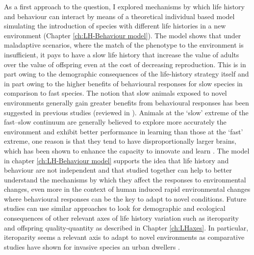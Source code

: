 As a first approach to the question, I explored mechanisms by which life history
and behaviour can interact by means of a theoretical individual based model
simulating the introduction of species with different life histories in a new
environment (Chapter \ref{ch:LH-Behaviour model}). The model shows that under
maladaptive scenarios, where the match of the phenotype to the environment is
insufficient, it pays to have a slow life history that increase the value of
adults over the value of offspring even at the cost of decreasing reproduction.
This is in part owing to the demographic consequences of the life-history
strategy itself and in part owing to the higher benefits of behavioural
responses for slow species in comparison to fast species.
The notion that slow animals exposed to novel environments generally gain
greater benefits from behavioural responses has been suggested in previous
studies (reviewed in \citet{Sol2016}). Animals at the ‘slow’ extreme of the
fast–slow continuum are generally believed to explore more accurately the
environment and exhibit better performance in learning than those at the ‘fast’
extreme, one reason is that they tend to have disproportionally larger brains,
which has been shown to enhance the capacity to innovate and learn
\citep{Lefebvre1997,Reader2002,Overington2009,Reader2011}. The model in chapter
\ref{ch:LH-Behaviour model} supports the idea that life history and behaviour
are not independent and that studied together can help to better understand the
mechanisms by which they affect the responses to environmental changes, even
more in the context of human induced rapid environmental changes where
behavioural responses can be the key to adapt to novel conditions. Future
studies can use similar approaches to look for demographic and ecological
consequences of other relevant axes of life history variation such as
iteroparity and offspring quality-quantity as described in Chapter
\ref{ch:LHaxes}. In particular, iteroparity seems a relevant axis to adapt to
novel environments as comparative studies have shown for invasive species
\citep{Sol2012a} an urban dwellers \citep{Sol2014,Sayol2020}.


